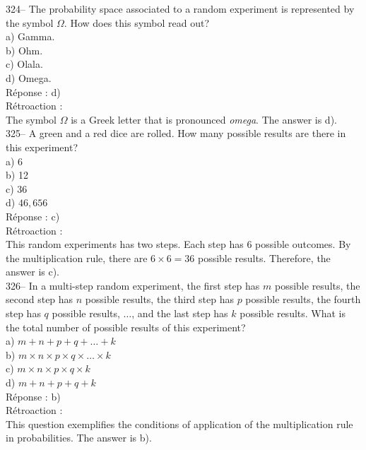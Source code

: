 \documentclass[letterpaper, 12pt]{article}
\begin{document}
324-- The probability space associated to a random experiment is represented by the symbol $\Omega$. How does this symbol read out?\\

a) Gamma.\\
b) Ohm.\\
c) Olala.\\
d) Omega.\\

R\'eponse : d)\\

R\'etroaction : \\
The symbol $\Omega$ is a Greek letter that is  pronounced \emph{omega}. The answer is d).\\

325-- A green and a red dice are rolled. How many possible results are there in this experiment?\\

a) 6\\
b) 12\\
c) 36\\
d) $46,656$\\

R\'eponse : c)\\

R\'etroaction : \\
This random experiments has two steps. Each step has 6 possible
outcomes. By the multiplication rule, there are
$6\times6=36$ possible results. Therefore, the answer is c).\\

326-- In a multi-step random experiment, the first step has $m$ possible results, the second step has $n$ possible results, the third step has $p$ possible results, the fourth step has $q$ possible results, $\ldots$, and the last step has $k$ possible results. What is the total number of possible results of this experiment?\\

a) $m+n+p+q+\ldots+k$\\
b) $m\times n\times p\times q\times \ldots \times k$\\
c) $m\times n\times p\times q\times k$\\
d) $m+n+p+q+k$\\

R\'eponse : b)\\

R\'etroaction : \\
This question exemplifies the conditions of application of the multiplication rule in probabilities. The answer is b).\\
\end{document}
